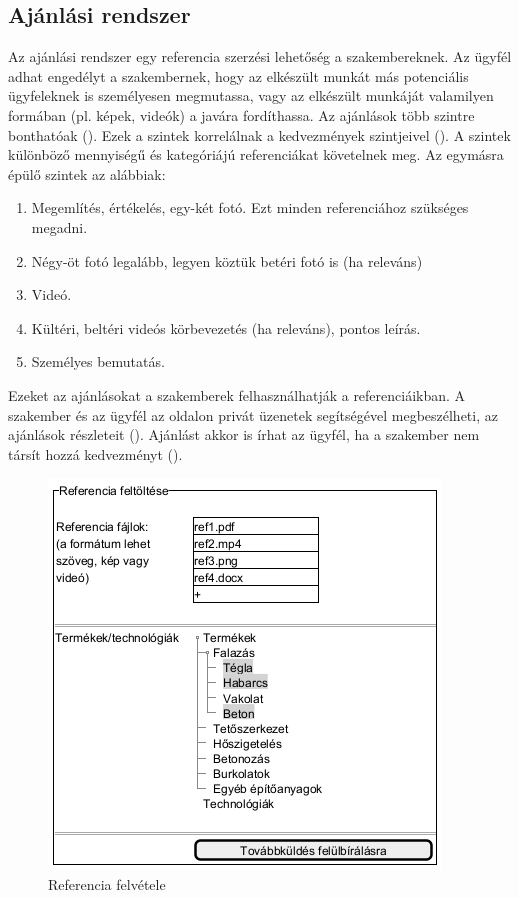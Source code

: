 \subsection{Ajánlási rendszer}
Az ajánlási rendszer egy referencia szerzési lehetőség a szakembereknek. Az ügyfél adhat engedélyt a szakembernek, hogy az elkészült munkát más potenciális ügyfeleknek is személyesen megmutassa, vagy az elkészült munkáját valamilyen formában (pl. képek, videók) a javára fordíthassa. Az ajánlások több szintre bonthatóak (). Ezek a szintek korrelálnak a kedvezmények szintjeivel (). A szintek különböző mennyiségű és kategóriájú referenciákat követelnek meg. Az egymásra épülő szintek az alábbiak:
\begin{enumerate}
  \item Megemlítés, értékelés, egy-két fotó. Ezt minden referenciához szükséges megadni.
  \item Négy-öt fotó legalább, legyen köztük betéri fotó is (ha releváns)
  \item Videó.
  \item Kültéri, beltéri videós körbevezetés (ha releváns), pontos leírás.
  \item Személyes bemutatás.
\end{enumerate}
Ezeket az ajánlásokat a szakemberek felhasználhatják a referenciáikban. A szakember és az ügyfél az oldalon privát üzenetek segítségével megbeszélheti, az ajánlások részleteit (). Ajánlást akkor is írhat az ügyfél, ha a szakember nem társít hozzá kedvezményt ().

\begin{figure}[h]
	\centering
	\includegraphics[scale=0.5]{img/referenciak.png}
	\caption*{Referencia felvétele}
	\label{fig:ref}
\end{figure}